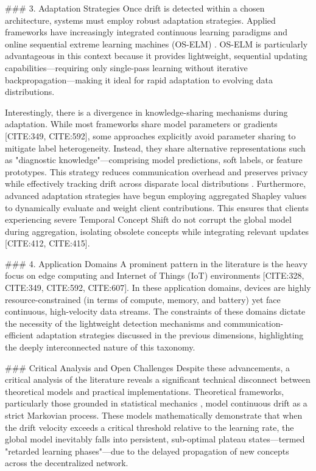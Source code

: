\documentclass[journal]{IEEEtran}
\begin{document}
\#\#\# 3. Adaptation Strategies
Once drift is detected within a chosen architecture, systems must employ robust adaptation strategies. Applied frameworks have increasingly integrated continuous learning paradigms \cite{Miao2025} and online sequential extreme learning machines (OS-ELM) \cite{Ito2021}. OS-ELM is particularly advantageous in this context because it provides lightweight, sequential updating capabilities—requiring only single-pass learning without iterative backpropagation—making it ideal for rapid adaptation to evolving data distributions.

Interestingly, there is a divergence in knowledge-sharing mechanisms during adaptation. While most frameworks share model parameters or gradients [CITE:349, CITE:592], some approaches explicitly avoid parameter sharing to mitigate label heterogeneity. Instead, they share alternative representations such as "diagnostic knowledge"—comprising model predictions, soft labels, or feature prototypes. This strategy reduces communication overhead and preserves privacy while effectively tracking drift across disparate local distributions \cite{Jiang2024}. Furthermore, advanced adaptation strategies have begun employing aggregated Shapley values to dynamically evaluate and weight client contributions. This ensures that clients experiencing severe Temporal Concept Shift do not corrupt the global model during aggregation, isolating obsolete concepts while integrating relevant updates [CITE:412, CITE:415].

\#\#\# 4. Application Domains
A prominent pattern in the literature is the heavy focus on edge computing and Internet of Things (IoT) environments [CITE:328, CITE:349, CITE:592, CITE:607]. In these application domains, devices are highly resource-constrained (in terms of compute, memory, and battery) yet face continuous, high-velocity data streams. The constraints of these domains dictate the necessity of the lightweight detection mechanisms and communication-efficient adaptation strategies discussed in the previous dimensions, highlighting the deeply interconnected nature of this taxonomy.

\#\#\# Critical Analysis and Open Challenges
Despite these advancements, a critical analysis of the literature reveals a significant technical disconnect between theoretical models and practical implementations. Theoretical frameworks, particularly those grounded in statistical mechanics \cite{Straat2018}, model continuous drift as a strict Markovian process. These models mathematically demonstrate that when the drift velocity exceeds a critical threshold relative to the learning rate, the global model inevitably falls into persistent, sub-optimal plateau states—termed "retarded learning phases"—due to the delayed propagation of new concepts across the decentralized network. 
\end{document}
